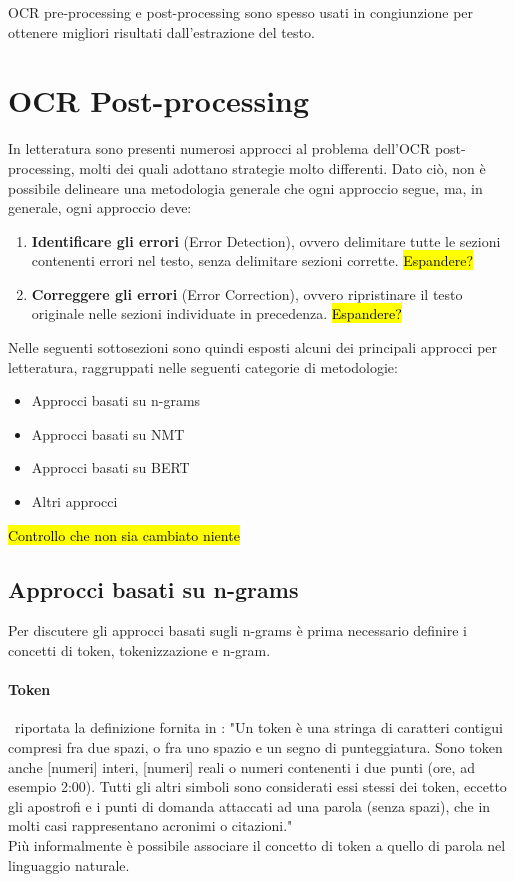 OCR pre-processing e post-processing sono spesso usati in congiunzione per ottenere migliori risultati dall'estrazione del testo.

\section{OCR Post-processing}
\label{sec:art_post_post}
In letteratura sono presenti numerosi approcci al problema dell'OCR post-processing, molti dei quali adottano strategie molto differenti. Dato ciò, non è possibile delineare una metodologia generale che ogni approccio segue, ma, in generale, ogni approccio deve:
\begin{enumerate}
\item \textbf{Identificare gli errori} (Error Detection), ovvero delimitare tutte le sezioni contenenti errori nel testo, senza delimitare sezioni corrette. \hl{Espandere?}
\item \textbf{Correggere gli errori} (Error Correction), ovvero ripristinare il testo originale nelle sezioni individuate in precedenza. \hl{Espandere?}
\end{enumerate}

Nelle seguenti sottosezioni sono quindi esposti alcuni dei principali approcci per letteratura, raggruppati nelle seguenti categorie di metodologie:
\begin{itemize}
\item Approcci basati su n-grams
\item Approcci basati su NMT
\item Approcci basati su BERT
\item Altri approcci
\end{itemize}

\hl{Controllo che non sia cambiato niente}

\subsection{Approcci basati su n-grams}
Per discutere gli approcci basati sugli n-grams è prima necessario definire i concetti di token, tokenizzazione e n-gram. 

\paragraph{Token}
\E\ riportata la definizione fornita in \cite{tokendef}: "Un token è una stringa di caratteri contigui compresi fra due spazi, o fra uno spazio e un segno di punteggiatura. Sono token anche [numeri] interi, [numeri] reali o numeri contenenti i due punti (ore, ad esempio 2:00). Tutti gli altri simboli sono considerati essi stessi dei token, eccetto gli apostrofi e i punti di domanda attaccati ad una parola (senza spazi), che in molti casi rappresentano acronimi o citazioni."\\
Più informalmente è possibile associare il concetto di token a quello di parola nel linguaggio naturale.

